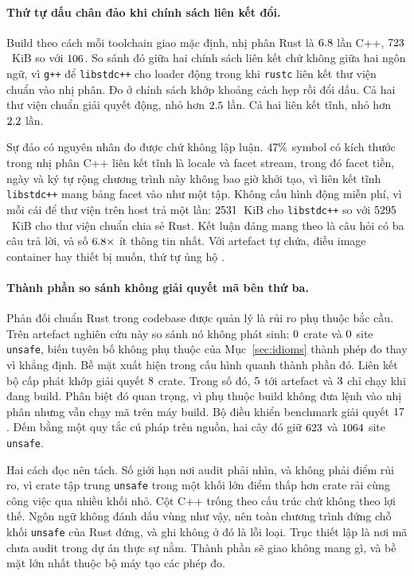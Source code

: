 \paragraph{Thứ tự dấu chân đảo khi chính sách liên kết đổi.}
Build theo cách mỗi toolchain giao mặc định, nhị phân Rust \texttt{\FootTarget} là
$6.8$ lần C++, $723$~KiB so với
$106$. So sánh đó giữa hai chính sách liên kết chứ không giữa hai ngôn ngữ,
vì \texttt{g++} để \texttt{libstdc++} cho loader động trong khi \texttt{rustc} liên kết
thư viện chuẩn vào nhị phân. Đo ở chính sách khớp khoảng cách hẹp rồi đổi
dấu. Cả hai thư viện chuẩn giải quyết động, \FootDynamicSmaller{} nhỏ hơn
$2.5$ lần. Cả hai liên kết tĩnh, \FootStaticSmaller{} nhỏ hơn
$2.2$ lần.

Sự đảo có nguyên nhân đo được chứ không lập luận. $47\%$ symbol
có kích thước trong nhị phân C++ liên kết tĩnh là locale và facet stream, trong đó facet tiền,
ngày và ký tự rộng chương trình này không bao giờ khởi tạo, vì liên kết tĩnh
\texttt{libstdc++} mang bảng facet vào như một tập. Không cấu hình động
miễn phí, vì mỗi cái để thư viện trên host trả một lần: $2531$~KiB
cho \texttt{libstdc++} so với $5295$~KiB cho thư viện chuẩn chia sẻ Rust. Kết luận
đáng mang theo là câu hỏi có ba câu trả lời, và số $6.8\times$
ít thông tin nhất. Với artefact tự chứa, điều image container hay thiết bị muốn, thứ tự ủng hộ \FootStaticSmaller{}.

\paragraph{Thành phần so sánh không giải quyết mã bên thứ ba.}
Phản đối chuẩn Rust trong codebase được quản lý là rủi ro phụ thuộc bắc cầu. Trên
artefact nghiên cứu này so sánh nó không phát sinh: $0$ crate và $0$
site \texttt{unsafe}, biến tuyên bố không phụ thuộc của Mục~\ref{sec:idioms} thành
phép đo thay vì khẳng định. Bề mặt xuất hiện trong cấu hình quanh
thành phần đó. Liên kết bộ cấp phát khớp giải quyết $8$ crate. Trong số đó,
$5$ tới artefact và $3$ chỉ chạy khi đang
build. Phân biệt đó quan trọng, vì phụ thuộc build không đưa lệnh vào
nhị phân nhưng vẫn chạy mã trên máy build. Bộ điều khiển benchmark giải quyết $17$.
Đếm bằng một quy tắc cú pháp trên nguồn, hai cây đó giữ
$623$ và $1064$ site \texttt{unsafe}.

Hai cách đọc nên tách. Số giới hạn nơi audit phải nhìn, và
không phải điểm rủi ro, vì crate tập trung \texttt{unsafe} trong một khối lớn điểm
thấp hơn crate rải cùng công việc qua nhiều khối nhỏ. Cột C++ trống theo
cấu trúc chứ không theo lợi thế. Ngôn ngữ không đánh dấu vùng như vậy, nên toàn chương trình đứng
chỗ khối \texttt{unsafe} của Rust đứng, và ghi không ở đó là lỗi loại. Trục
thiết lập là nơi mã chưa audit trong dự án thực sự nằm. Thành phần sẽ
giao không mang gì, và bề mặt lớn nhất thuộc bộ máy tạo
các phép đo.

